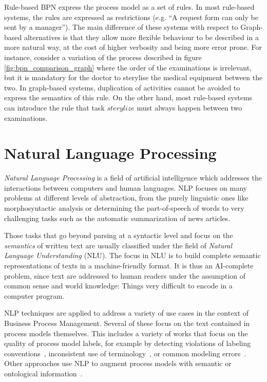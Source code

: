 Rule-based BPN express the process model as a set of rules. In most rule-based
systems, the rules are expressed as restrictions (e.g. ``A request form can only
be sent by a manager''). The main difference of these systems with respect to
Graph-based alternatives is that they allow more flexible behaviour to be
described in a more natural way, at the cost of higher verbosity and being more
error prone. For instance, consider a variation of the process described in
figure \ref{fig:bpn_comparison_graph} where the order of the examinations is
irrelevant, but it is mandatory for the doctor to sterylise the medical
equipment between the two. In graph-based systems, duplication of activities
cannot be avoided to express the semantics of this rule. On the other hand, most
rule-based systems can introduce the rule that task $sterylize$ must always
happen between two examinations.

\section{Natural Language Processing}
\label{sec:background_nlp}

\emph{Natural Language Processing} is a field of artificial intelligence which
addresses the interactions between computers and human languages. NLP focuses on
many problems at different levels of abstraction, from the purely linguistic
ones like morphosyntactic analysis or determining the part-of-speech of words
to very challenging tasks such as the automatic summarization of news articles.

Those tasks that go beyond parsing at a syntactic level and focus on the
\emph{semantics} of written text are usually classified under the field of
\emph{Natural Language Understanding} (NLU). The focus in NLU is to build
complete semantic representations of texts in a machine-friendly format. It is
thus an AI-complete\cite[Section 1]{ai_completeness} problem, since text are
addressed to human readers under the assumption of common sense and world
knowledge: Things very difficult to encode in a computer program. 

NLP techniques are applied to address a variety of use cases in the context of
Business Process Management. Several of these focus on the text contained in
process models themselves. This includes a variety of works that focus on the
quality of process model labels, for example by detecting violations of labeling
conventions~\cite{becker2009,leopold2013detection,vandervos1997verification},
inconsistent use of terminology~\cite{koschmider2007}, or common modeling
errors~\cite{gruhn2011detecting}. Other approaches use NLP to augment process
models with semantic or ontological
information~\cite{leopold2015towards,francescomarino2009supporting,born2007userfriendly}.

